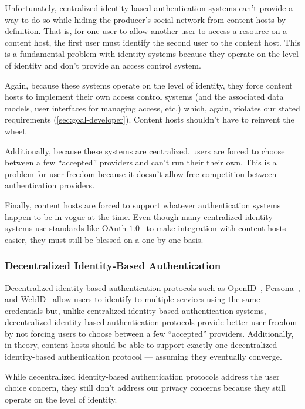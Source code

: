 \documentclass[pdftex,12pt,a4papaer,twoside,notitlepage]{report}
\begin{document}
Unfortunately, centralized identity-based authentication systems can't provide a
way to do so while hiding the producer's social network from content hosts by
definition. That is, for one user to allow another user to access a resource on
a content host, the first user must identify the second user to the content
host. This is a fundamental problem with identity systems because they operate
on the level of identity and don't provide an access control system.

Again, because these systems operate on the level of identity, they force
content hosts to implement their own access control systems (and the associated
data models, user interfaces for managing access, etc.) which, again, violates
our stated requirements (\cref{sec:goal-developer}). Content hosts
shouldn't have to reinvent the wheel.

Additionally, because these systems are centralized, users are forced to choose
between a few ``accepted'' providers and can't run their their own. This is a
problem for user freedom because it doesn't allow free competition between
authentication providers.

Finally, content hosts are forced to support whatever authentication systems
happen to be in vogue at the time. Even though many centralized identity systems
use standards like OAuth $1.0$~\cite{oauth} to make integration with content
hosts easier, they must still be blessed on a one-by-one basis.

\subsubsection{Decentralized Identity-Based Authentication}

Decentralized identity-based authentication protocols such as
OpenID~\cite{openid}, Persona~\cite{persona}, and WebID~\cite{webid} allow users
to identify to multiple services using the same credentials but, unlike
centralized identity-based authentication systems, decentralized identity-based
authentication protocols provide better user freedom by not forcing users to
choose between a few ``accepted'' providers. Additionally, in theory, content
hosts should be able to support exactly one decentralized identity-based
authentication protocol --- assuming they eventually converge.

While decentralized identity-based authentication protocols address the user
choice concern, they still don't address our privacy concerns because they still
operate on the level of identity.
\end{document}
